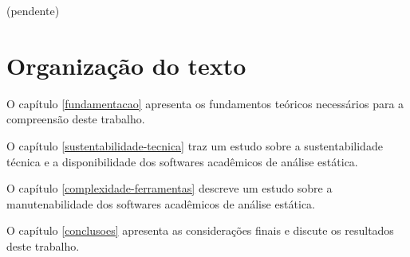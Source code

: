 (pendente)

\section{Organização do texto}

O capítulo \ref{fundamentacao} apresenta os fundamentos teóricos necessários
para a compreensão deste trabalho.

O capítulo \ref{sustentabilidade-tecnica} traz um estudo sobre a
sustentabilidade técnica e a disponibilidade dos softwares acadêmicos de
análise estática.

O capítulo \ref{complexidade-ferramentas} descreve um estudo sobre a
manutenabilidade dos softwares acadêmicos de análise estática.

O capítulo \ref{conclusoes} apresenta as considerações finais e discute os
resultados deste trabalho.
